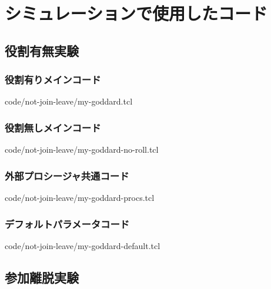 \chapter{シミュレーションで使用したコード}

\section{役割有無実験}

\subsection{役割有りメインコード}
\label{txt:not-join-leave-my-goddard}

{code/not-join-leave/my-goddard.tcl}

\subsection{役割無しメインコード}
\label{txt:not-join-leave-my-goddard-no-roll}

{code/not-join-leave/my-goddard-no-roll.tcl}

\subsection{外部プロシージャ共通コード}
\label{txt:not-join-leavemy-goddard-procs}

{code/not-join-leave/my-goddard-procs.tcl}

\subsection{デフォルトパラメータコード}
\label{txt:not-join-leave-my-goddard-default}

{code/not-join-leave/my-goddard-default.tcl}

\section{参加離脱実験}

